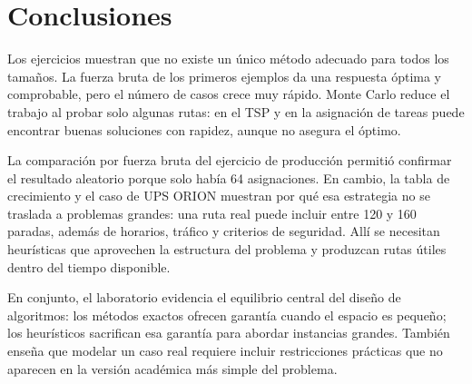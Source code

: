 \documentclass{article}
\begin{document}
\section{Conclusiones}
Los ejercicios muestran que no existe un único método adecuado para todos los tamaños. La fuerza bruta de los primeros ejemplos da una respuesta óptima y comprobable, pero el número de casos crece muy rápido. Monte Carlo reduce el trabajo al probar solo algunas rutas: en el TSP y en la asignación de tareas puede encontrar buenas soluciones con rapidez, aunque no asegura el óptimo.

La comparación por fuerza bruta del ejercicio de producción permitió confirmar el resultado aleatorio porque solo había 64 asignaciones. En cambio, la tabla de crecimiento y el caso de UPS ORION muestran por qué esa estrategia no se traslada a problemas grandes: una ruta real puede incluir entre 120 y 160 paradas, además de horarios, tráfico y criterios de seguridad. Allí se necesitan heurísticas que aprovechen la estructura del problema y produzcan rutas útiles dentro del tiempo disponible.

En conjunto, el laboratorio evidencia el equilibrio central del diseño de algoritmos: los métodos exactos ofrecen garantía cuando el espacio es pequeño; los heurísticos sacrifican esa garantía para abordar instancias grandes. También enseña que modelar un caso real requiere incluir restricciones prácticas que no aparecen en la versión académica más simple del problema.
\printbibliography[title={Referencias}]
			
\end{document}
